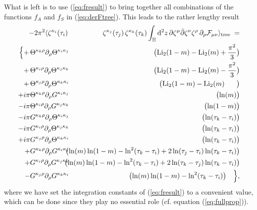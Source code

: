 \documentclass[a4paper,12pt]{article}
\let\bra=\langle        \let\ket=\rangle
\newcommand {\ud} {\mathrm{d}}
\newcommand {\cF} {{\cal F}}
\newcommand {\bbH}{\mathbb{H}}
\newcommand {\Back}{\!\!\!\!\!}
\newcommand {\Li} {\mathrm{Li}_2}
\begin{document}
What is left is to use (\ref{eq:fresult}) to bring together all
combinations of the functions $f_A$ and $f_S$ in (\ref{eq:derFtree}).
This leads to the rather lengthy result
\begin{eqnarray}
  \label{eq:derFres}
  - 2 \pi^2
  \bra\zeta^{\kappa_i}(\tau_i)\,\Back & & \Back\zeta^{\kappa_j}(\tau_j)\,
       \zeta^{\kappa_k}(\tau_k) 
      \int _\bbH \ud^2z \, 
      \partial \zeta^\mu \bar\partial \zeta^\nu \zeta^\rho \, 
      \partial_\rho \cF_{\mu\nu}\ket_{\mathrm{tree}} \; = \nonumber 
\\
   \Bigl\{
  + \, \Theta^{\kappa_k \rho}\partial_\rho \Theta^{\kappa_i \kappa_j}
       \Back & & \Back\bigl(  \Li(1-m) - \Li(m) + \frac {\pi^2}{3}
       \bigr) \nonumber 
\\
  + \, \Theta^{\kappa_i \rho}\partial_\rho \Theta^{\kappa_j \kappa_k} 
       \Back & & \Back\bigl(  \Li(1-m) - \Li(m) - \frac {\pi^2}{3}
       \bigr)\nonumber 
\\
  +  \,\Theta^{\kappa_j \rho}\partial_\rho \Theta^{\kappa_k \kappa_i} 
       \Back & & \Back\bigl(  \Li(1-m) - \Li(m) \quad\;\;\, \bigr) \nonumber 
\\
  +  i\pi \Theta^{\kappa_k \rho}\partial_\rho G^{\kappa_i \kappa_j}
       \Back & & \Back\bigl(  \ln (m) \bigr) \nonumber 
\\
  -  i\pi \Theta^{\kappa_i \rho}\partial_\rho G^{\kappa_j \kappa_k}
       \Back & & \Back\bigl(  \ln (1-m) \bigr) \nonumber 
\\
  -  i\pi G^{\kappa_k \rho} \partial_\rho \Theta^{\kappa_i \kappa_j}
       \Back & & \Back\bigl(  \ln(\tau_k - \tau_i) \bigr)   \nonumber 
\\
  -  i\pi G^{\kappa_i \rho} \partial_\rho \Theta^{\kappa_j \kappa_k}
       \Back & & \Back\bigl(  \ln(\tau_k - \tau_i) \bigr)   \nonumber 
\\
  +  i\pi G^{\kappa_j \rho} \partial_\rho \Theta^{\kappa_k \kappa_i}
       \Back & & \Back\bigl(  \ln(\tau_k - \tau_i) \bigr)   \nonumber 
\\
  +  G^{\kappa_k \rho} \partial_\rho G^{\kappa_i \kappa_j}
     \Back & & \Back 
     \bigl(  \ln (m) \ln(1-m) - \ln^2(\tau_k - \tau_i) 
                + 2 \ln(\tau_j-\tau_i) \ln(\tau_k-\tau_i)\bigr) \nonumber 
\\
  +  G^{\kappa_i \rho} \partial_\rho G^{\kappa_j \kappa_k}
     \Back & & \Back 
     \bigl(  \ln (m) \ln(1-m) - \ln^2(\tau_k - \tau_i)
                + 2 \ln(\tau_k-\tau_j) \ln(\tau_k-\tau_i)\bigr) \nonumber 
\\
  -  G^{\kappa_j \rho} \partial_\rho G^{\kappa_k \kappa_i}
     \Back & & \Back 
     \bigl(  \ln (m) \ln(1-m) - \ln^2(\tau_k - \tau_i)\bigr)
     \quad \Bigr\} ,
\end{eqnarray}
where we have set the integration constants of (\ref{eq:fresult}) to
a convenient value, which can be done since they play no essential role
(cf. equation (\ref{eq:fullprop})).
\end{document}

